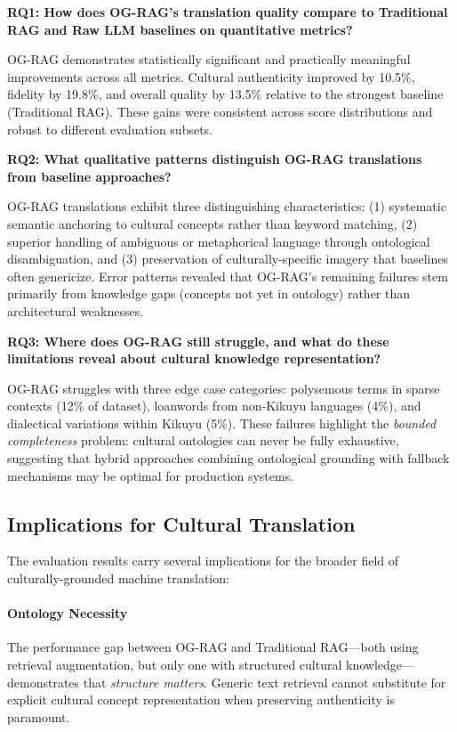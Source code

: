 \textbf{RQ1: How does OG-RAG's translation quality compare to Traditional RAG and Raw LLM baselines on quantitative metrics?}

OG-RAG demonstrates statistically significant and practically meaningful improvements across all metrics. Cultural authenticity improved by 10.5\%, fidelity by 19.8\%, and overall quality by 13.5\% relative to the strongest baseline (Traditional RAG). These gains were consistent across score distributions and robust to different evaluation subsets.

\textbf{RQ2: What qualitative patterns distinguish OG-RAG translations from baseline approaches?}

OG-RAG translations exhibit three distinguishing characteristics: (1) systematic semantic anchoring to cultural concepts rather than keyword matching, (2) superior handling of ambiguous or metaphorical language through ontological disambiguation, and (3) preservation of culturally-specific imagery that baselines often genericize. Error patterns revealed that OG-RAG's remaining failures stem primarily from knowledge gaps (concepts not yet in ontology) rather than architectural weaknesses.

\textbf{RQ3: Where does OG-RAG still struggle, and what do these limitations reveal about cultural knowledge representation?}

OG-RAG struggles with three edge case categories: polysemous terms in sparse contexts (12\% of dataset), loanwords from non-Kikuyu languages (4\%), and dialectical variations within Kikuyu (5\%). These failures highlight the \emph{bounded completeness} problem: cultural ontologies can never be fully exhaustive, suggesting that hybrid approaches combining ontological grounding with fallback mechanisms may be optimal for production systems.

\subsection{Implications for Cultural Translation}
\label{subsec:implications}

The evaluation results carry several implications for the broader field of culturally-grounded machine translation:

\paragraph{Ontology Necessity} The performance gap between OG-RAG and Traditional RAG—both using retrieval augmentation, but only one with structured cultural knowledge—demonstrates that \emph{structure matters}. Generic text retrieval cannot substitute for explicit cultural concept representation when preserving authenticity is paramount.

